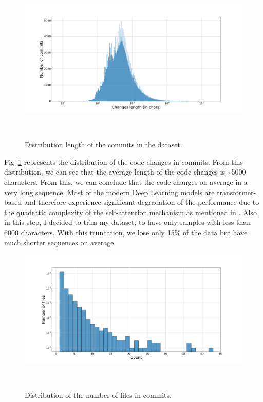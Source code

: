\begin{figure}[H]
    \includegraphics[scale=0.30]{figs/changes_len_dist.png}
    \caption{Distribution length of the commits in the dataset.}~\label{fig:changes_len_dist}
\end{figure}
Fig~\ref{fig:changes_len_dist} represents the distribution of the code changes in commits. From this distribution, we can see that the average length of the code changes is \textasciitilde{}5000 characters. From this, we can conclude that the code changes on average in a very long sequence. Most of the modern Deep Learning models are transformer-based and therefore experience significant degradation of the performance due to the quadratic complexity of the self-attention mechanism as mentioned in {}\cite{keles2023computational}. Also in this step, I decided to trim my dataset, to have only samples with less than 6000 characters. With this truncation, we lose only 15\% of the data but have much shorter sequences on average.
\begin{figure}[H]
    \includegraphics[scale=0.30]{figs/Commit num files distribution.png}
    \caption{Distribution of the number of files in commits.}~\label{fig:Commit num files distribution}
\end{figure}

